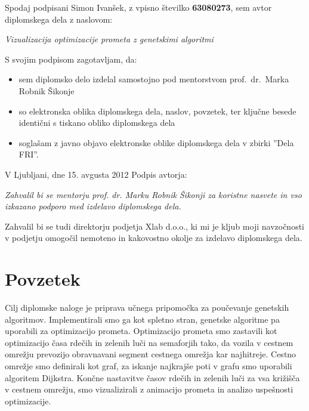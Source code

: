 \documentclass[a4paper, 12pt]{book}
\newcommand{\clearemptydoublepage}{\newpage{\pagestyle{empty}\cleardoublepage}}
\begin{document}
\vspace{1cm}
\noindent Spodaj podpisani Simon Ivan\v sek,
z vpisno \v stevilko \textbf{63080273}, sem avtor  diplomskega dela z naslovom:
   
\vspace{0.5cm}
\emph{Vizualizacija optimizacije prometa z genetskimi algoritmi}

\vspace{1.5cm}
\noindent S svojim podpisom zagotavljam, da:
\begin{itemize}
	\item sem diplomsko delo izdelal samostojno pod mentorstvom 
		prof.\ dr.\ Marka Robnik \v Sikonje

	\item	so elektronska oblika diplomskega dela, naslov, povzetek, ter klju\v cne besede identi\v cni s tiskano obliko diplomskega dela
	\item sogla\v sam z javno objavo elektronske oblike diplomskega dela v zbirki ''Dela FRI''.
\end{itemize}

\vspace{1cm}
\noindent V Ljubljani, dne 15. avgusta 2012 \hfill Podpis avtorja:

\clearemptydoublepage

\thispagestyle{empty}\mbox{}\vfill\null\it
Zahvalil bi se mentorju prof. dr. Marku Robnik \v Sikonji za koristne nasvete in vso izkazano podporo med izdelavo diplomskega dela.

Zahvalil bi se tudi direktorju podjetja Xlab d.o.o., ki mi je kljub moji navzo\v cnosti v podjetju omogo\v cil nemoteno in kakovostno okolje za izdelavo diplomskega dela.
\rm\normalfont
 
\clearemptydoublepage

\def\thepage{}%
\tableofcontents{}


\clearemptydoublepage

\chapter*{Povzetek}
Cilj diplomske naloge je priprava u\v cnega pripomo\v cka za pou\v cevanje genetskih algoritmov. Implementirali smo ga kot spletno stran, genetske algoritme pa uporabili za optimizacijo prometa. Optimizacijo prometa smo zastavili kot optimizacijo \v casa rde\v cih in zelenih lu\v ci na semaforjih tako, da vozila v cestnem omre\v zju prevozijo obravnavani segment cestnega omre\v zja kar najhitreje. Cestno omre\v zje smo definirali kot graf, za iskanje najkraj\v se poti v grafu smo uporabili algoritem Dijkstra. Kon\v cne nastavitve \v casov rde\v cih in zelenih lu\v ci za vsa kri\v zi\v s\v ca v cestnem omre\v zju, smo vizualizirali z animacijo prometa in analizo uspe\v snosti optimizacije.
\end{document}
